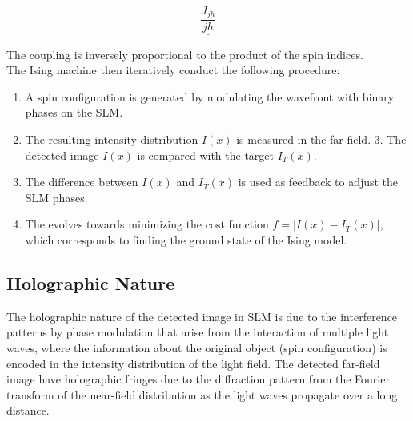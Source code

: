 \begin{equation}
\underline{\frac{J_{jh}}{jh}}
\end{equation}

The coupling is inversely proportional to the product of the spin indices. \\

The Ising machine then iteratively conduct the following procedure:
\begin{enumerate}
\item A spin configuration is generated by modulating the wavefront with binary phases on the SLM. 
\item The resulting intensity distribution $I(x)$ is measured in the far-field. 
3. The detected image $I(x)$ is compared with the target $I_T(x)$.
\item The difference between $I(x)$ and $I_T(x)$ is used as feedback to adjust the SLM phases.
\item The evolves towards minimizing the cost function $f = |I(x) - I_T(x)|$, which corresponds to finding the ground state of the Ising model. 
\end{enumerate}

\subsection{Holographic Nature}
The holographic nature of the detected image in SLM is due to the interference patterns by phase modulation that arise from the interaction of multiple light waves, where the information about the original object (spin configuration) is encoded in the intensity distribution of the light field. The detected far-field image have holographic fringes due to the diffraction pattern from the Fourier transform of the near-field distribution as the light waves propagate over a long distance. \\


